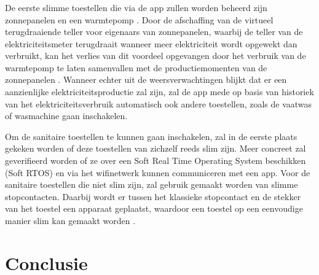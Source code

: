 \subsection{}%
\label{sec:Aansturing slimme stekkers aansturen op basis van voorspelde stroomproductie}

De eerste slimme toestellen die via de app zullen worden beheerd zijn zonnepanelen en een warmtepomp \autocite{Uytterhoeven2019}. Door de afschaffing van de virtueel terugdraaiende teller voor eigenaars van zonnepanelen, waarbij de teller van de elektriciteitsmeter terugdraait wanneer meer elektriciteit wordt opgewekt dan verbruikt, kan het verlies van dit voordeel opgevangen door het verbruik van de warmtepomp te laten samenvallen met de productiemomenten van de zonnepanelen \autocite{Selleslagh2021}. Wanneer echter uit de weersverwachtingen blijkt dat er een aanzienlijke elektriciteitsproductie zal zijn, zal de app  mede op basis van historiek van het elektriciteitsverbruik automatisch ook andere toestellen, zoals de vaatwas of wasmachine gaan inschakelen.

 Om de sanitaire toestellen te kunnen gaan inschakelen, zal in de eerste plaats gekeken worden of deze toestellen van zichzelf reeds slim zijn. Meer concreet zal geverifieerd worden of ze over een Soft Real Time Operating System beschikken (Soft RTOS) en via het wifinetwerk kunnen communiceren met een app. Voor de sanitaire toestellen die niet slim zijn, zal gebruik gemaakt worden van slimme stopcontacten. Daarbij wordt er tussen het klassieke stopcontact en de stekker van het toestel een apparaat geplaatst, waardoor een toestel op een eenvoudige manier slim kan gemaakt worden \autocite{Jong2020}.

\chapter{Conclusie}%
\label{ch:Conclusie}